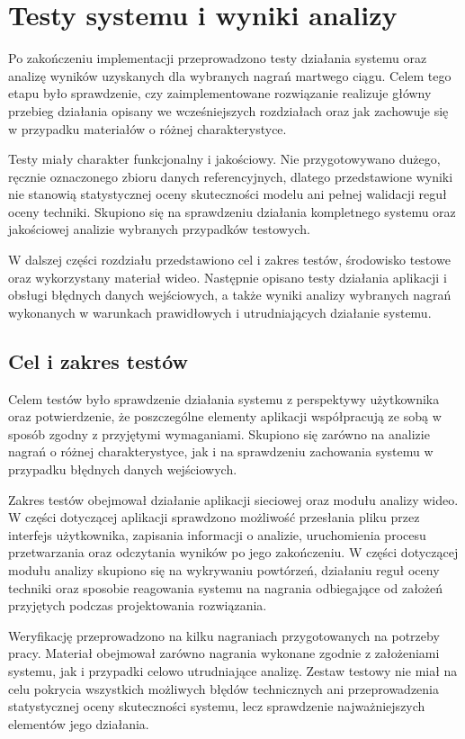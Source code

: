 \section{Testy systemu i wyniki analizy}

Po zakończeniu implementacji przeprowadzono testy działania systemu oraz analizę wyników uzyskanych dla wybranych nagrań martwego ciągu. Celem tego etapu było sprawdzenie, czy zaimplementowane rozwiązanie realizuje główny przebieg działania opisany we wcześniejszych rozdziałach oraz jak zachowuje się w przypadku materiałów o różnej charakterystyce.

Testy miały charakter funkcjonalny i jakościowy. Nie przygotowywano dużego, ręcznie oznaczonego zbioru danych referencyjnych, dlatego przedstawione wyniki nie stanowią statystycznej oceny skuteczności modelu ani pełnej walidacji reguł oceny techniki. Skupiono się na sprawdzeniu działania kompletnego systemu oraz jakościowej analizie wybranych przypadków testowych.

W dalszej części rozdziału przedstawiono cel i zakres testów, środowisko testowe oraz wykorzystany materiał wideo. Następnie opisano testy działania aplikacji i obsługi błędnych danych wejściowych, a także wyniki analizy wybranych nagrań wykonanych w warunkach prawidłowych i utrudniających działanie systemu.

\subsection{Cel i zakres testów}

Celem testów było sprawdzenie działania systemu z perspektywy użytkownika oraz potwierdzenie, że poszczególne elementy aplikacji współpracują ze sobą w sposób zgodny z przyjętymi wymaganiami. Skupiono się zarówno na analizie nagrań o różnej charakterystyce, jak i na sprawdzeniu zachowania systemu w przypadku błędnych danych wejściowych.

Zakres testów obejmował działanie aplikacji sieciowej oraz modułu analizy wideo. W części dotyczącej aplikacji sprawdzono możliwość przesłania pliku przez interfejs użytkownika, zapisania informacji o analizie, uruchomienia procesu przetwarzania oraz odczytania wyników po jego zakończeniu. W części dotyczącej modułu analizy skupiono się na wykrywaniu powtórzeń, działaniu reguł oceny techniki oraz sposobie reagowania systemu na nagrania odbiegające od założeń przyjętych podczas projektowania rozwiązania.

Weryfikację przeprowadzono na kilku nagraniach przygotowanych na potrzeby pracy. Materiał obejmował zarówno nagrania wykonane zgodnie z założeniami systemu, jak i przypadki celowo utrudniające analizę. Zestaw testowy nie miał na celu pokrycia wszystkich możliwych błędów technicznych ani przeprowadzenia statystycznej oceny skuteczności systemu, lecz sprawdzenie najważniejszych elementów jego działania.

